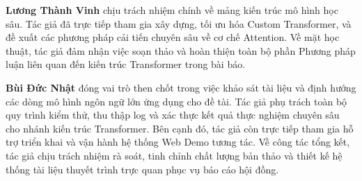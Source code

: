 \documentclass{article}
\begin{document}
\textbf{Lương Thành Vinh} chịu trách nhiệm chính về mảng kiến trúc mô hình học sâu. Tác giả đã trực tiếp tham gia xây dựng, tối ưu hóa Custom Transformer, và đề xuất các phương pháp cải tiến chuyên sâu về cơ chế Attention. Về mặt học thuật, tác giả đảm nhận việc soạn thảo và hoàn thiện toàn bộ phần Phương pháp luận liên quan đến kiến trúc Transformer trong bài báo.

\textbf{Bùi Đức Nhật} đóng vai trò then chốt trong việc khảo sát tài liệu và định hướng các dòng mô hình ngôn ngữ lớn ứng dụng cho đề tài. Tác giả phụ trách toàn bộ quy trình kiểm thử, thu thập log và xác thực kết quả thực nghiệm chuyên sâu cho nhánh kiến trúc Transformer. Bên cạnh đó, tác giả còn trực tiếp tham gia hỗ trợ triển khai và vận hành hệ thống Web Demo tương tác. Về công tác tổng kết, tác giả chịu trách nhiệm rà soát, tinh chỉnh chất lượng bản thảo và thiết kế hệ thống tài liệu thuyết trình trực quan phục vụ báo cáo hội đồng.
\end{document}
